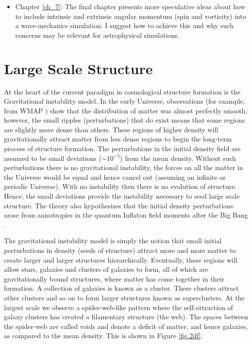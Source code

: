 \begin{itemize}
\item Chapter \ref{ch_7}:
The final chapter presents more speculative ideas about how to include intrinsic and extrinsic angular momentum (spin and vorticity) into a wave-mechanics simulation. I suggest how to achieve this and why such concerns may be relevant for astrophysical simulations.
\end{itemize}

%
\section{Large Scale Structure}
\label{lss}
At the heart of the current paradigm in cosmological structure formation is the Gravitational instability model. In the early Universe, observations (for example, from WMAP \citep{bib_wmap}) show that the distribution of matter was almost perfectly smooth; however, the small ripples (perturbations) that do exist means that some regions are slightly more dense than others. These regions of higher density will gravitationally attract matter from less dense regions to begin the long-term process of structure formation. The perturbations in the initial density field are assumed to be small deviations ($\sim10^{-5}$) from the mean density. Without such perturbations there is no gravitational instability, the forces on all the matter in the Universe would be equal and hence cancel out (assuming an infinite or periodic Universe). With no instability then there is no evolution of structure. Hence, the small deviations provide the instability necessary to seed large scale structure. The theory also hypothesizes that the initial density perturbations arose from anisotropies in the quantum Inflaton field moments after the Big Bang \citep{bib_peebles, bib_peeb, bib_pea}.

The gravitational instability model is simply the notion that small initial perturbations in density (seeds of structure) attract more and more matter to create larger and larger structures hierarchically. Eventually, these regions will allow stars, galaxies and clusters of galaxies to form, all of which are gravitationally bound structures, where matter has come together in their formation. A collection of galaxies is known as a cluster. These clusters attract other clusters and so on to form larger structures known as superclusters. At the largest scale we observe a spider-web-like pattern where the self-attraction of galaxy clusters has created a filamentary structure (the web). The spaces between the spider-web are called voids and denote a deficit of matter, and hence galaxies, as compared to the mean density. This is shown in Figure \ref{fig.2df}.

